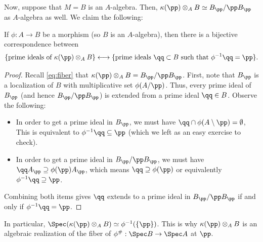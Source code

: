Now, suppose that $M=B$ is an $A$-algebra.
Then, $\kappa(\pp) \otimes_A B \simeq B_\pp/\pp B_\pp$
as $A$-algebra as well.
We claim the following:
\begin{proposition}
    \label{prop:fiber}
    If $\phi : A\to B$ be a morphism
    (so $B$ is an $A$-algebra), then 
    there is a bijective correspondence between
    $$\{\text{prime ideals of }\kappa(\pp)\otimes_A B\}
    \longleftrightarrow 
    \{\text{prime ideals } \qq\subset B 
    \text{ such that } \phi^{-1}\qq = \pp\}.$$
\end{proposition}
\begin{proof}
    Recall \eqref{eq:fiber} that $\kappa(\pp)\otimes_A B 
    = B_\pp/\pp B_\pp$.
    First, note that $B_\pp$ is a localization of $B$
    with multiplicative set $\phi(A/\pp)$.
    Thus, every prime ideal of $B_\pp$ (and hence $B_\pp/\pp B_\pp$)
    is extended from a prime ideal $\qq\in B$.
    Observe the following:
    \begin{itemize}
    \item In order to get a prime ideal in $B_\pp$,
    we must have $\qq\cap \phi(A\setminus\pp) = \emptyset$,
    This is equivalent to $\phi^{-1}\qq \subseteq \pp$
    (which we left as an easy exercise to check).
    \item In order to get a prime ideal in $B_\pp/\pp B_\pp$,
    we must have $\qq A_\pp \supseteq \phi(\pp)A_\pp$,
    which means $\qq\supseteq\phi(\pp)$
    or equivalently $\phi^{-1}\qq \supseteq \pp$.
    \end{itemize}
    Combining both items gives $\qq$ extends to 
    a prime ideal in $B_\pp/\pp B_\pp$ if and only if
    $\phi^{-1}\qq=\pp$.
\end{proof}
In particular, $\Spec(\kappa(\pp)\otimes_A B)
\simeq \phi^{-1}(\{\pp\})$.
This is why $\kappa(\pp)\otimes_A B$ is 
an algebraic realization of the fiber of
$\phi^\# : \Spec B\to\Spec A$ at $\pp$.

